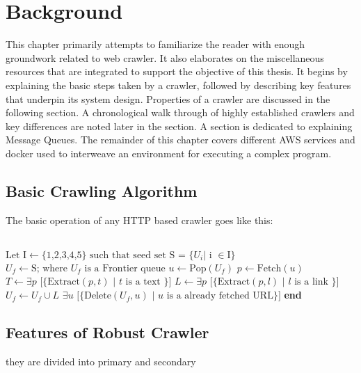 \chapter{Background}
This chapter primarily attempts to familiarize the reader with enough groundwork related to web crawler. It
also elaborates on the miscellaneous resources that are integrated to support the objective of this thesis.
It begins by explaining the basic steps taken by a crawler, followed by describing key features that
underpin its system design. Properties of a crawler are discussed in the following section. A
chronological walk through of highly established crawlers and key differences are noted later in the
section. A section is dedicated to explaining Message Queues. The remainder of this chapter covers
different AWS services and docker used to interweave an environment for executing a complex program.


\section{Basic Crawling Algorithm}
The basic operation of any HTTP based crawler goes like this:
\\
\\
\begin{algorithm}
\begin{algorithmic}[1]
  \State $\text{Let I} \gets \text{\{1,2,3,4,5\}} \text{ such that seed set S = \{} U_i \text{| i } \in \text{I\}}$
  \State $U_f \gets \text{S; where } U_f \text{ is a Frontier queue}$
    \State $u \gets \text{Pop}(U_f)$ 
    \State $p \gets \text{Fetch}(u)$
    \State $T \gets \exists p\text{ [\{Extract}(p, t) \text{ | } t \text{ is a text \}]}$
    \State $L \gets \exists p\text{ [\{Extract}(p, l) \text{ | } l \text{ is a link \}]}$
    \State $U_f \gets U_f \cup L$
    \State $\exists u\text{ [\{Delete}(U_f, u) \text{ | } u \text{ is a already fetched URL\}]}$
  \EndWhile
\EndProcedure
\State \textbf{end}
\end{algorithmic}
\end{algorithm}

\section{Features of Robust Crawler}
they are divided into primary and secondary \cite{einstein}

\pagebreak